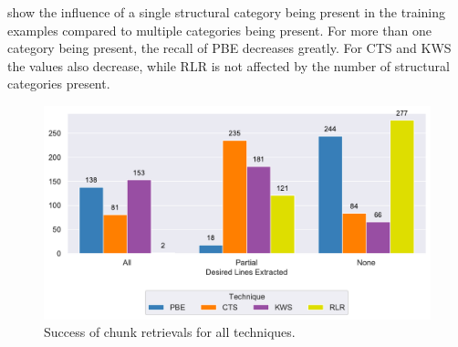 
show the influence of a single structural category being present in the
training examples compared to multiple categories being present.
For more
than one category being present, the recall of PBE decreases greatly.
For CTS and KWS the values also decrease, while RLR is not affected by
the number of structural categories present.

\begin{figure}[!t]
		\centering
		\includegraphics[width=\columnwidth,
		clip]{img/big-study/success-partial-all.pdf}
		\caption{Success of chunk retrievals for all techniques.}
		\label{fig:success-partial-all}
\end{figure}

